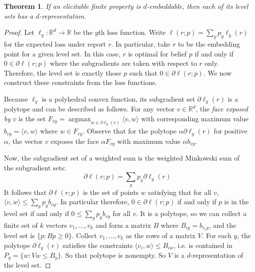 \documentclass[12pt]{article}
\newtheorem{theorem}{Theorem}
\theoremstyle{definition}
\DeclareMathOperator*{\argmax}{\textrm{argmax}}
\newcommand{\reals}{\mathbb{R}}
\begin{document}
\begin{theorem}
  If an elicitable finite property is $d$-embeddable, then each of its level sets has a $d$-representation.
\end{theorem}
\begin{proof}
  Let $\ell_y: \reals^d \to \reals$ be the $y$th loss function.
  Write $\ell(r;p) = \sum_y p_y \ell_y(r)$ for the expected loss under report $r$.
  In particular, take $r$ to be the embedding point for a given level set.
  In this case, $r$ is optimal for belief $p$ if and only if $0 \in \partial \ell(r;p)$ where the subgradients are taken with respect to $r$ only.
  Therefore, the level set is exactly those $p$ such that $0 \in \partial \ell(r;p)$.
  We now construct these constraints from the loss functions.

  Because $\ell_y$ is a polyhedral convex function, its subgradient set $\partial \ell_y(r)$ is a polytope and can be described as follows.
  For any vector $v \in \reals^d$, the \emph{face exposed by $v$} is the set $F_{vy} = \argmax_{w \in \partial \ell_y(r)} \langle v, w \rangle$ with corresponding maximum value $b_{vy} = \langle v, w \rangle$ where $w \in F_{vy}$.
  Observe that for the polytope $\alpha \partial \ell_y(r)$ for positive $\alpha$, the vector $v$ exposes the face $\alpha F_{vy}$ with maximum value $\alpha b_{vy}$.

  Now, the subgradient set of a weighted sum is the weighted Minkowski sum of the subgradient sets:
    \[ \partial \ell(r;p) = \sum_y p_y \partial \ell_y(r) \]
  It follows that $\partial \ell(r;p)$ is the set of points $w$ satisfying that for all $v$, $\langle v,w \rangle \leq \sum_y p_y b_{vy}$.
  In particular therefore, $0 \in \partial \ell(r;p)$ if and only if $p$ is in the level set if and only if $0 \leq \sum_y p_y b_{vy}$ for all $v$.
  It is a polytope, so we can collect a finite set of $k$ vectors $v_1,\dots,v_k$ and form a matrix $B$ where $B_{iy} = b_{v_iy}$, and the level set is $\{p : B p \geq 0 \}$.
  Collect $v_1,\dots,v_k$ as the rows of a matrix $V$.
  For each $y$, the polytope $\partial \ell_y(r)$ satisfies the constraints $\langle v_i,w\rangle \leq B_{iw}$, i.e. is contained in $P_y = \{ w : Vw \leq B_y\}$.
  So that polytope is nonempty.
  So $V$ is a $d$-representation of the level set.
\end{proof}
\end{document}
